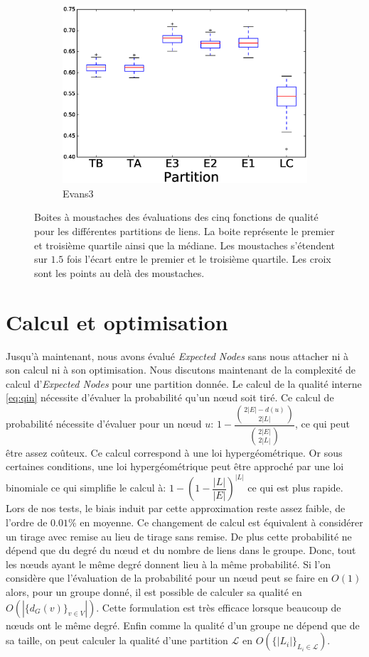 \begin{figure}
\begin{subfigure}{0.31\textwidth}
		\includegraphics[width=\linewidth]{img/ExpectedNodes/LF/LFR1_Evans3_ALL.eps}
		\caption{\label{fig:LFE3}Evans3}		
	\end{subfigure}
	\caption{Boites à moustaches des évaluations des cinq fonctions de qualité pour les différentes partitions de liens. 
	La boite représente le premier et troisième quartile ainsi que la médiane.
	Les moustaches s'étendent sur $1.5$ fois l'écart entre le premier et le troisième quartile. 
	Les croix sont les points au delà des moustaches.
	}
	\label{fig:LF}
\end{figure}


\section{Calcul et optimisation}
Jusqu'à maintenant, nous avons évalué \emph{Expected Nodes} sans nous attacher ni à son calcul ni à son optimisation.
Nous discutons maintenant de la complexité de calcul d'\emph{Expected Nodes} pour une partition donnée.
Le calcul de la qualité interne \ref{eq:qin} nécessite d'évaluer la probabilité qu'un n\oe ud soit tiré.
Ce calcul de probabilité nécessite d'évaluer pour un n\oe ud $u$: $1 - \dfrac{ \binom{2|E|-d(u)}{2|L|} }{ \binom{2|E|}{2|L|} }$, ce qui peut être assez coûteux.
Ce calcul correspond à une loi hypergéométrique.
Or sous certaines conditions, une loi hypergéométrique peut être approché par une loi binomiale ce qui simplifie le calcul à: $1 - (1- \dfrac{|L|}{|E|})^{|L|}$ ce qui est plus rapide.
Lors de nos tests, le biais induit par cette approximation reste assez faible, de l'ordre de $0.01\%$ en moyenne.
Ce changement de calcul est équivalent à considérer un tirage avec remise au lieu de tirage sans remise.
De plus cette probabilité ne dépend que du degré du n\oe ud et du nombre de liens dans le groupe.
Donc, tout les n\oe uds ayant le même degré donnent lieu à la même probabilité.
Si l'on considère que l'évaluation de la probabilité pour un n\oe ud peut se faire en $O(1)$ alors, pour un groupe donné, il est possible de calculer sa qualité en $O(|\{d_G(v)\}_{v \in V}|)$.
Cette formulation est très efficace lorsque beaucoup de n\oe uds ont le même degré.
Enfin comme la qualité d'un groupe ne dépend que de sa taille, on peut calculer la qualité d'une partition $\mathcal{L}$ en $O(\{|L_i|\}_{L_i \in \mathcal{L}})$.

